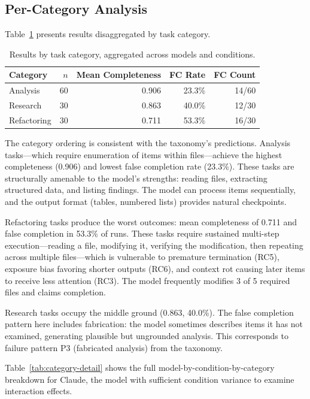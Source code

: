 \subsection{Per-Category Analysis}
\label{sec:exp-category}

Table~\ref{tab:category} presents results disaggregated by task category.

\begin{table}[htbp]
\centering
\caption{Results by task category, aggregated across models and conditions.}
\label{tab:category}
\begin{tabular}{lrrrr}
\toprule
Category & $n$ & Mean Completeness & FC Rate & FC Count \\
\midrule
Analysis & 60 & 0.906 & 23.3\% & 14/60 \\
Research & 30 & 0.863 & 40.0\% & 12/30 \\
Refactoring & 30 & 0.711 & 53.3\% & 16/30 \\
\bottomrule
\end{tabular}
\end{table}

The category ordering is consistent with the taxonomy's predictions.
Analysis tasks---which require enumeration of items within files---achieve the highest completeness (0.906) and lowest false completion rate (23.3\%).
These tasks are structurally amenable to the model's strengths: reading files, extracting structured data, and listing findings.
The model can process items sequentially, and the output format (tables, numbered lists) provides natural checkpoints.

Refactoring tasks produce the worst outcomes: mean completeness of 0.711 and false completion in 53.3\% of runs.
These tasks require sustained multi-step execution---reading a file, modifying it, verifying the modification, then repeating across multiple files---which is vulnerable to premature termination (RC5), exposure bias favoring shorter outputs (RC6), and context rot causing later items to receive less attention (RC3).
The model frequently modifies 3 of 5 required files and claims completion.

Research tasks occupy the middle ground (0.863, 40.0\%).
The false completion pattern here includes fabrication: the model sometimes describes items it has not examined, generating plausible but ungrounded analysis.
This corresponds to failure pattern P3 (fabricated analysis) from the taxonomy.

Table~\ref{tab:category-detail} shows the full model-by-condition-by-category breakdown for Claude, the model with sufficient condition variance to examine interaction effects.

